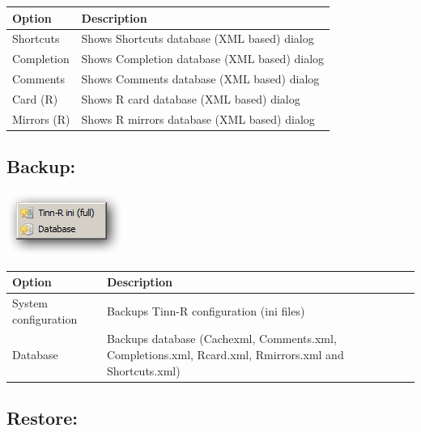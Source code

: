 \begin{scriptsize}\begin{tabularx}{\textwidth}{>{\hsize=0.3\hsize}X>{\hsize=0.7\hsize}X}\\
    \hline
    \textbf{Option} & \textbf{Description} \\
    \hline
    Shortcuts & Shows Shortcuts database (XML based) dialog \\
    Completion & Shows Completion database (XML based) dialog \\
    Comments & Shows Comments database (XML based) dialog \\
    Card (R) & Shows R card database (XML based) dialog \\
    Mirrors (R) & Shows R mirrors database (XML based) dialog \\
    \hline
  \end{tabularx}\end{scriptsize}


\hypertarget{menu_tools_backup}{}
\subsection{Backup:}

\includegraphics[scale=0.50]{./res/menu_tools_backup.png}\\

\begin{scriptsize}\begin{tabularx}{\textwidth}{>{\hsize=0.3\hsize}X>{\hsize=0.7\hsize}X}\\
    \hline
    \textbf{Option} & \textbf{Description} \\
    \hline
    System configuration & Backups Tinn-R configuration (ini files) \\
    Database & Backups database (Cachexml, Comments.xml, Completions.xml, Rcard.xml, Rmirrors.xml and Shortcuts.xml) \\
    \hline
  \end{tabularx}\end{scriptsize}


\hypertarget{menu_tools_restore}{}
\subsection{Restore:}

